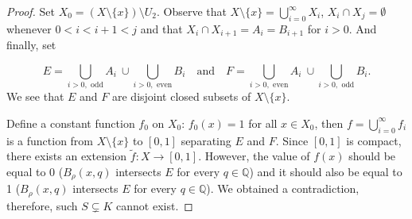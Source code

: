 \begin{proof}
    Set $X_0 = (X\setminus \{x\})\setminus U_2$. Observe that $X\setminus \{x\} = \bigcup_{i=0}^\infty X_i$, $X_i\cap X_j = \emptyset$ whenever $0<i<i+1<j$ and that $X_i\cap X_{i+1} = A_i = B_{i+1}$ for $i>0$.
    And finally, set

    $$ E = \bigcup_{i>0, \text{ odd}} A_i ~\cup \bigcup_{i>0, \text{ even}} B_i\quad\text{and}\quad F = \bigcup_{i>0, \text{ even}} A_i ~\cup \bigcup_{i>0, \text{ odd}} B_i. $$
    We see that $E$ and $F$ are disjoint closed subsets of $X\setminus \{x\}$.

    Define a constant function $f_0$ on $X_0$: $f_0(x) = 1$ for all $x\in X_0$, then $ f = \bigcup_{i=0}^{\infty} f_i $ is a function from $X\setminus \{x\}$ to $[0,1]$ separating $E$ and $F$. Since $[0,1]$ is compact, there exists an extension $\tilde f\colon X \to [0,1]$. However, the value of $f(x)$ should be equal to 0 ($B_\rho(x,q)$ intersects $E$ for every $q\in \mathbb Q$) and it should also be equal to 1 ($B_\rho(x,q)$ intersects $E$ for every $q\in \mathbb Q$). We obtained a contradiction, therefore, such $S\subsetneq K$ cannot exist.
\end{proof}

